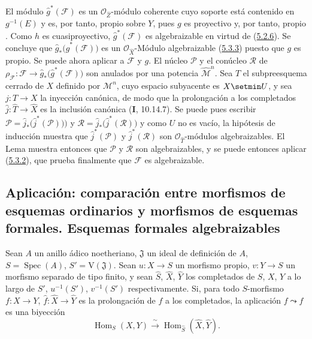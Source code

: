 El módulo $\widehat g^{*}(\mathcal F)$ es un
$\mathcal O_{\widehat Z}$-módulo coherente cuyo soporte está contenido en
$g^{-1}(E)$ y es, por tanto, propio sobre $Y$, pues $g$ es
proyectivo y, por tanto, propio . Como $h$ es
cuasiproyectivo, $\widehat g^{*}(\mathcal F)$ es
algebraizable en virtud de (\hyperref[III.5.2.6-fr]{5.2.6}). Se concluye
que $\widehat g_*\bigl(\widehat g^{*}(\mathcal F)\bigr)$
es un $\mathcal O_{\widehat X}$-Módulo algebraizable
(\hyperref[III.5.3.3-fr]{5.3.3}) puesto que $g$ es propio. Se puede ahora
aplicar a $\mathcal F$ y $g$. El núcleo $\mathcal P$
y el conúcleo $\mathcal R$ de
$\rho_{\mathcal F}:\mathcal F\to
\widehat g_*\bigl(\widehat g^{*}(\mathcal F)\bigr)$
son anulados por una potencia $\widehat{\mathcal M}^{n}$. Sea $T$
el subpreesquema cerrado de $X$ definido por $\mathcal M^n$, cuyo
espacio subyacente es $X\setmin U$, y sea $j:T\to X$ la inyección canónica, de modo que la prolongación a los completados $\widehat j:\widehat T\to\widehat X$ es la inclusión canónica (\textbf{I}, 10.14.7). Se
puede pues escribir
$\mathcal P=\widehat j_*\bigl(\widehat j^{*}(\mathcal P)\bigr))$ y
$\mathcal R=\widehat j_*\bigl(\widehat j^{*}(\mathcal R)\bigr)$ y como $U$ no es vacío, la hipótesis de inducción muestra que
$\widehat j^{*}(\mathcal P)$ y
$\widehat j^{*}(\mathcal R)$ son $\mathcal O_{\widehat T}$-módulos
algebraizables. El Lema  muestra entonces
que $\mathcal P$ y $\mathcal R$ son algebraizables, y se puede entonces aplicar (\hyperref[III.5.3.2-fr]{5.3.2}), que prueba finalmente que $\mathcal F$ es algebraizable.



\subsection{Aplicación: comparación entre morfismos de esquemas ordinarios y morfismos de esquemas formales. Esquemas formales algebraizables}
\label{subsection:III.5.4}
\label{subsection:III.5.4-fr}

\begin{theorem}[5.4.1]
\label{III.5.4.1-fr}
Sean $A$ un anillo ádico noetheriano, $\mathfrak J$ un ideal de definición de
$A$, $S=\operatorname{Spec}(A)$, $S'=\mathrm V(\mathfrak J)$. Sean
$u:X\to S$ un morfismo propio, $v:Y\to S$ un morfismo separado de tipo finito, y
sean $\widehat S$, $\widehat X$, $\widehat Y$ los completados de $S$, $X$, $Y$ a lo
largo de $S'$, $u^{-1}(S')$, $v^{-1}(S')$ respectivamente. Si, para todo
$S$-morfismo $f:X\to Y$, $\widehat f:\widehat X\to\widehat Y$ es la
prolongación de $f$ a los completados, la aplicación $f\leadsto\widehat f$ es una
biyección
\[
\operatorname{Hom}_S(X,Y)\xrightarrow{\ \sim\ }
\operatorname{Hom}_{\widehat S}(\widehat X,\widehat Y).
\]
\end{theorem}


